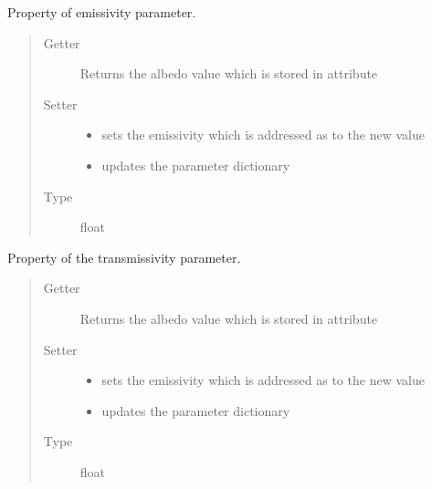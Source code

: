 \documentclass[letterpaper,10pt,english]{sphinxmanual}
\begin{document}
\begin{fulllineitems}
\begin{fulllineitems}
\end{fulllineitems}


\begin{fulllineitems}
\label{api/climlab.radiation:climlab.radiation.Boltzmann.Boltzmann.eps}
Property of emissivity parameter.
\begin{quote}\begin{description}
\item[{Getter}] \leavevmode
Returns the albedo value which is stored in attribute 

\item[{Setter}] \leavevmode\begin{itemize}
\item {} 
sets the emissivity which is addressed as 
to the new value

\item {} 
updates the parameter dictionary 

\end{itemize}

\item[{Type}] \leavevmode
float

\end{description}\end{quote}

\end{fulllineitems}


\begin{fulllineitems}
\label{api/climlab.radiation:climlab.radiation.Boltzmann.Boltzmann.tau}
Property of the transmissivity parameter.
\begin{quote}\begin{description}
\item[{Getter}] \leavevmode
Returns the albedo value which is stored in attribute 

\item[{Setter}] \leavevmode\begin{itemize}
\item {} 
sets the emissivity which is addressed as 
to the new value

\item {} 
updates the parameter dictionary 

\end{itemize}

\item[{Type}] \leavevmode
float

\end{description}\end{quote}

\end{fulllineitems}


\end{fulllineitems}
\end{document}
